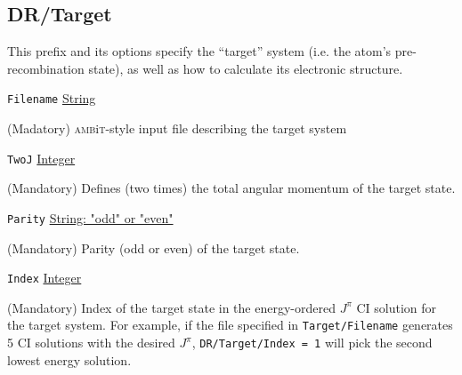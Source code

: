 \documentclass{report}
\newcommand{\ambit}{\textsc{amb}{\footnotesize i}\textsc{t}}
\begin{document}
\subsection{DR/Target}
This prefix and its options specify the ``target'' system (i.e. the atom's pre-recombination state), as
well as how to calculate its electronic structure.

\texttt{Filename} \uline{String}
\begin{adjustwidth}{1cm}{}
(Madatory) \ambit-style input file describing the target system
\end{adjustwidth}

\texttt{TwoJ} \uline{Integer}
\begin{adjustwidth}{1cm}{}
(Mandatory) Defines (two times) the total angular momentum of the target state.
\end{adjustwidth}

\texttt{Parity} \uline{String: "odd" or "even"}
\begin{adjustwidth}{1cm}{}
(Mandatory) Parity (odd or even) of the target state.
\end{adjustwidth}

\texttt{Index} \uline{Integer}
\begin{adjustwidth}{1cm}{}
(Mandatory) Index of the target state in the energy-ordered $J^{\pi}$ CI solution for the target system. 
For example, if the file specified in \texttt{Target/Filename} generates 5 CI solutions with the desired
$J^{\pi}$, \texttt{DR/Target/Index = 1} will pick the second lowest energy solution.
\end{adjustwidth}
\end{document}
